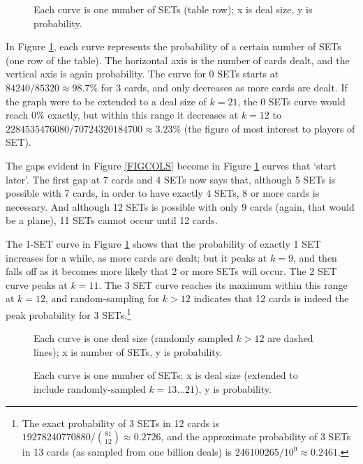 \documentclass[10pt]{amsart}
\newcommand{\SET}{SET\texttrademark}  %
\begin{document}
\begin{figure}[!htb]
  \caption{\label{FIGROWS} Each curve is one number of SETs (table row); x is
    deal size, y is probability.}
\end{figure}

In Figure \ref{FIGROWS}, each curve represents the probability of a certain
number of SETs (one row of the table). The horizontal axis is the number of
cards dealt, and the vertical axis is again probability. The curve for 0 SETs starts
at $84240/85320\approx 98.7\%$ for 3 cards, and only decreases as more cards are
dealt. If the graph were to be extended to a deal size of $k=21$, the 0 SETs
curve would reach $0\%$ exactly, but within this range it decreases at $k=12$ to
$2284535476080/70724320184700\approx 3.23\%$ (the figure of most interest to
players of \SET).

The gaps evident in Figure \ref{FIGCOLS} become in Figure \ref{FIGROWS} curves
that `start later'. The first gap at 7 cards and 4 SETs now says that, although
5 SETs is possible with 7 cards, in order to have exactly 4 SETs, 8 or more
cards is necessary. And although 12 SETs is possible with only 9 cards (again,
that would be a plane), 11 SETs cannot occur until 12 cards.

The 1-SET curve in Figure \ref{FIGROWS} shows that the probability of exactly 1
SET increases for a while, as more cards are dealt; but it peaks at $k=9$, and
then falls off as it becomes more likely that 2 or more SETs will occur. The 2
SET curve peaks at $k=11$. The 3 SET curve reaches its maximum within this range
at $k=12$, and random-sampling for $k>12$ indicates that 12 cards is indeed the
peak probability for 3 SETs.\footnote{The exact probability of 3 SETs in 12
cards is $19278240770880/\binom{81}{12}\approx 0.2726$, and the approximate
probability of 3 SETs in 13 cards (as sampled from one billion deals) is
$246100265/10^9\approx 0.2461$.}

\begin{figure}[!htb]
  \caption{\label{FIGCOLSFULL} Each curve is one deal size (randomly sampled $k>12$
    are dashed lines); x is number of SETs, y is probability.}
\end{figure}

\begin{figure}[!htb]
  \caption{\label{FIGROWSFULL} Each curve is one number of SETs; x is deal size
    (extended to include randomly-sampled $k=13\ldots 21$), y is probability.}
\end{figure}
\end{document}
